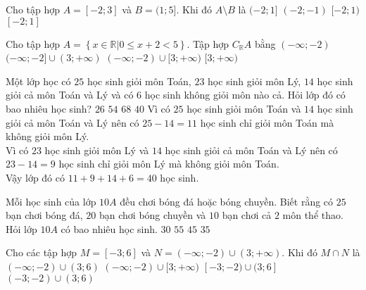 \begin{ex}%
	Cho tập hợp $ A=[-2;3] $ và $ B=(1;5] $. Khi đó $ A\setminus B $ là
	\choice
	{$(-2;1]$}
	{$(-2;-1)$}
	{$[-2;1) $}
	{\True $[-2;1]$}
	\loigiai{
		Ta có $ A\setminus B =[-2;3]\setminus(1;5]= [-2;1]$. 
	}
\end{ex}

\begin{ex}%
	Cho tập hợp $A=\left\{x \in \mathbb{R} |  0 \le x+2 <5 \right\}$. Tập hợp $C_{\mathbb{R}}A$ bằng
	\choice
	{$(-\infty;-2)$}
	{$(-\infty;-2] \cup (3;+\infty)$}
	{\True $(-\infty;-2) \cup [3;+\infty)$}
	{$[3;+\infty)$}
	\loigiai{
		Ta có: $C_{\mathbb{R}}A=(-\infty;-2) \cup [3;+\infty)$.}
\end{ex}
\begin{ex}%
	Một lớp học có $25$ học sinh giỏi môn Toán, $23$ học sinh giỏi môn Lý, $14$ học sinh giỏi cả môn Toán và Lý và có $6$ học sinh không giỏi môn nào cả. Hỏi lớp đó có bao nhiêu học sinh?
	\choice
	{$26$}
	{$54$}
	{$68$}
	{\True $40$}
	\loigiai
	{
		Vì có $25$ học sinh giỏi môn Toán và $14$ học sinh giỏi cả môn Toán và Lý nên có $25-14=11$ học sinh chỉ giỏi môn Toán mà không giỏi môn Lý. \\
		Vì có $23$ học sinh giỏi môn Lý và $14$ học sinh giỏi cả môn Toán và Lý nên có $23-14=9$ học sinh chỉ giỏi môn Lý mà không giỏi môn Toán. \\
		Vậy lớp đó có $11+9+14+6=40$ học sinh.
	}
\end{ex}
\begin{ex}%
	Mỗi học sinh của lớp $10A$ đều chơi bóng đá hoặc bóng chuyền. Biết rằng có $25$ bạn chơi bóng đá, $20$ bạn chơi bóng chuyền và $10$ bạn chơi cả $2$ môn thể thao. Hỏi lớp $10A$ có bao nhiêu học sinh.
	\choice
	{$30$}
	{$55$}
	{$45$}
	{\True $35$}
\end{ex}
\begin{ex}%
	Cho các tập hợp $M=[-3;6]$ và $N=(-\infty; -2)\cup (3;+\infty)$. Khi đó $M\cap N$ là
	\choice
	{$(-\infty;-2)\cup (3;6)$}
	{$(-\infty;-2)\cup [3;+\infty)$}
	{\True $[-3;-2)\cup (3;6]$}
	{$(-3;-2)\cup (3;6)$}
\end{ex}


